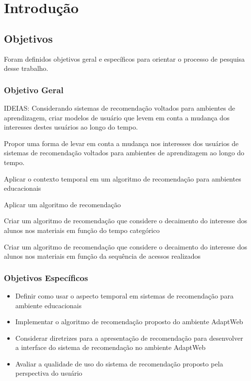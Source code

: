 \chapter{Introdução}\label{introducao}

\section{Objetivos}

Foram definidos objetivos geral e específicos para orientar o processo de pesquisa desse trabalho.

\subsection{Objetivo Geral}

IDEIAS:
Considerando sistemas de recomendação voltados para ambientes de aprendizagem, criar modelos de usuário que levem em
conta a mudança dos interesses destes usuários ao longo do tempo.

Propor uma forma de levar em conta a mudança nos interesses dos usuários de sistemas de recomendação voltados para ambientes
de aprendizagem ao longo do tempo.

Aplicar o contexto temporal em um algoritmo de recomendação para ambientes educacionais


Aplicar um algoritmo de recomendação

Criar um algoritmo de recomendação que considere o decaimento do interesse dos alunos nos materiais em função do
tempo categórico

Criar um algoritmo de recomendação que considere o decaimento do interesse dos alunos nos materiais em função da
sequência de acessos realizados


\subsection{Objetivos Específicos}

\begin{itemize}
\item Definir como usar o aspecto temporal em sistemas de recomendação para ambiente educacionais
\item Implementar o algoritmo de recomendação proposto do ambiente AdaptWeb\textsuperscript{\textregistered}
\item Considerar diretrizes para a apresentação de recomendação para desenvolver a interface do sistema de recomendação
no ambiente AdaptWeb\textsuperscript{\textregistered}
\item Avaliar a qualidade de uso do sistema de recomendação proposto pela perspectiva do usuário
\end{itemize}

